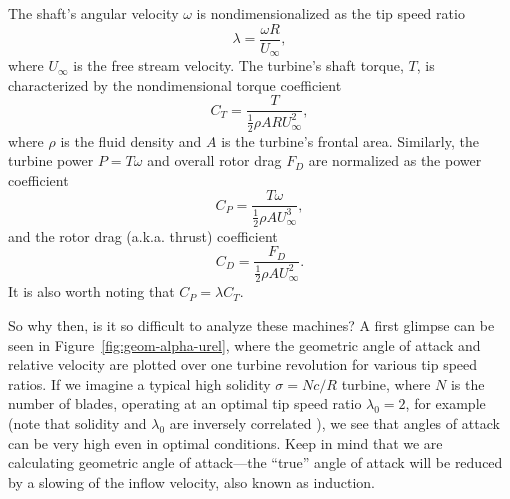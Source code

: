 The shaft's angular velocity $\omega$ is nondimensionalized as the tip speed
ratio
\begin{equation}
    \lambda = \frac{\omega R}{U_\infty},
    \label{eq:lambda}
\end{equation}
where $U_\infty$ is the free stream velocity. The turbine's shaft torque, $T$,
is characterized by the nondimensional torque coefficient
\begin{equation}
    C_T = \frac{T}{\frac{1}{2} \rho A R U_\infty^2},
    \label{eq:ct}
\end{equation}
where $\rho$ is the fluid density and $A$ is the turbine's frontal area.
Similarly, the turbine power $P = T\omega$ and overall rotor drag $F_D$ are
normalized as the power coefficient
\begin{equation}
    C_P = \frac{T \omega}{\frac{1}{2} \rho A U_\infty^3},
    \label{eq:cp}
\end{equation}
and the rotor drag (a.k.a. thrust) coefficient
\begin{equation}
    C_D = \frac{F_D}{\frac{1}{2} \rho A U_\infty^2}.
    \label{eq:cd}
\end{equation}
It is also worth noting that $C_P = \lambda C_T$.


So why then, is it so difficult to analyze these machines? A first glimpse can
be seen in Figure~\ref{fig:geom-alpha-urel}, where the geometric angle of attack
and relative velocity are plotted over one turbine revolution for various tip
speed ratios. If we imagine a typical high solidity $\sigma = Nc/R$ turbine,
where $N$ is the number of blades, operating at an optimal tip speed ratio
$\lambda_0 = 2$, for example \cite{Howell2010} (note that solidity and
$\lambda_0$ are inversely correlated \cite{Templin1974}), we see that angles of
attack can be very high even in optimal conditions. Keep in mind that we are
calculating geometric angle of attack---the ``true'' angle of attack will be
reduced by a slowing of the inflow velocity, also known as induction.

